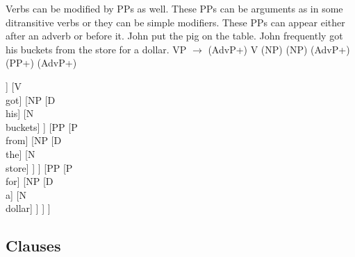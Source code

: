 \xe
Verbs can be modified by PPs as well. These PPs can be arguments as in some ditransitive verbs or they can be simple modifiers. These PPs can appear either after an adverb or before it.
\pex
\a John put the pig on the table.
\a John frequently got his buckets from the store for a dollar.
\a VP $\rightarrow$ (AdvP+) V (NP) (NP) (AdvP+) (PP+) (AdvP+)
\a
\begin{forest}
	[VP,for tree={s sep=1em} [AdvP [Adv\\frequently] ] [V\\got] [NP [D\\his] [N\\buckets] ] [PP [P\\from] [NP [D\\the] [N\\store] ] ] [PP [P\\for] [NP [D\\a] [N\\dollar] ] ] ]
\end{forest}
\xe


\subsection{Clauses}

